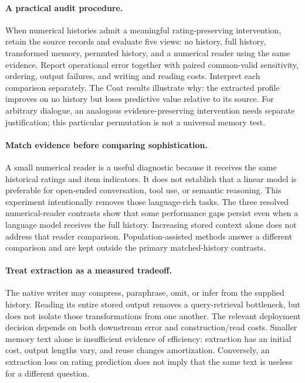 \paragraph{A practical audit procedure.}
When numerical histories admit a meaningful rating-preserving intervention, retain the source records and evaluate five views: no history, full history, transformed memory, permuted history, and a numerical reader using the same evidence. Report operational error together with paired common-valid sensitivity, ordering, output failures, and writing and reading costs. Interpret each comparison separately. The Coat results illustrate why: the extracted profile improves on no history but loses predictive value relative to its source. For arbitrary dialogue, an analogous evidence-preserving intervention needs separate justification; this particular permutation is not a universal memory test.

\paragraph{Match evidence before comparing sophistication.}
A small numerical reader is a useful diagnostic because it receives the same historical ratings and item indicators. It does not establish that a linear model is preferable for open-ended conversation, tool use, or semantic reasoning. This experiment intentionally removes those language-rich tasks. The three resolved numerical-reader contrasts show that some performance gaps persist even when a language model receives the full history. Increasing stored context alone does not address that reader comparison. Population-assisted methods answer a different comparison and are kept outside the primary matched-history contrasts.

\paragraph{Treat extraction as a measured tradeoff.}
The native writer may compress, paraphrase, omit, or infer from the supplied history. Reading its entire stored output removes a query-retrieval bottleneck, but does not isolate those transformations from one another. The relevant deployment decision depends on both downstream error and construction/read costs. Smaller memory text alone is insufficient evidence of efficiency: extraction has an initial cost, output lengths vary, and reuse changes amortization. Conversely, an extraction loss on rating prediction does not imply that the same text is useless for a different question.

